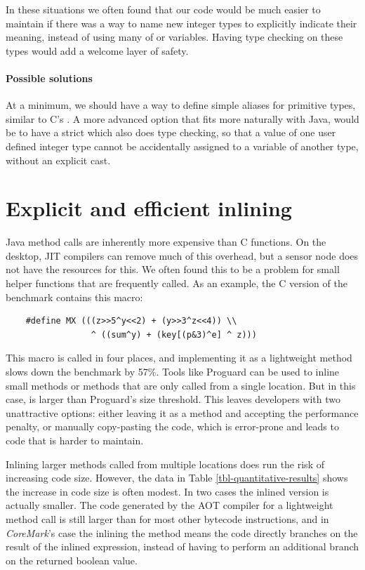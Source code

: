 In these situations we often found that our code would be much easier to maintain if there was a way to name new integer types to explicitly indicate their meaning, instead of using many of  or  variables. Having type checking on these types would add a welcome layer of safety.

\paragraph{Possible solutions}
At a minimum, we should have a way to define simple aliases for primitive types, similar to C's . A more advanced option that fits more naturally with Java, would be to have a strict  which also does type checking, so that a value of one user defined integer type cannot be accidentally assigned to a variable of another type, without an explicit cast.




\section{Explicit and efficient inlining}
\label{sec-inlining}
Java method calls are inherently more expensive than C functions. On the desktop, JIT compilers can remove much of this overhead, but a sensor node does not have the resources for this. We often found this to be a problem for small helper functions that are frequently called. As an example, the C version of the  benchmark contains this macro: 

\begin{verbatim}
    #define MX (((z>>5^y<<2) + (y>>3^z<<4)) \\
                 ^ ((sum^y) + (key[(p&3)^e] ^ z)))
\end{verbatim}

This macro is called in four places, and implementing it as a lightweight method slows down the benchmark by 57\%. Tools like Proguard \cite{proguard} can be used to inline small methods or methods that are only called from a single location. But in this case,  is larger than Proguard's size threshold. This leaves developers with two unattractive options: either leaving it as a method and accepting the performance penalty, or manually copy-pasting the code, which is error-prone and leads to code that is harder to maintain.

Inlining larger methods called from multiple locations does run the risk of increasing code size. However, the data in Table \ref{tbl-quantitative-results} shows the increase in code size is often modest. In two cases the inlined version is actually smaller. The code generated by the AOT compiler for a lightweight method call is still larger than for most other bytecode instructions, and in \emph{CoreMark}'s case the inlining the  method means the code directly branches on the result of the inlined expression, instead of having to perform an additional branch on the returned boolean value.

